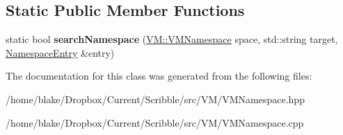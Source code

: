 \subsection*{Static Public Member Functions}
\begin{DoxyCompactItemize}
\item 
\hypertarget{class_v_m_1_1_namespace_entry_ad60d6ff4c19fdcd7ed3bf36ff6874bcf}{static bool {\bfseries search\-Namespace} (\hyperlink{class_hash_map}{V\-M\-::\-V\-M\-Namespace} space, std\-::string target, \hyperlink{class_v_m_1_1_namespace_entry}{Namespace\-Entry} \&entry)}\label{class_v_m_1_1_namespace_entry_ad60d6ff4c19fdcd7ed3bf36ff6874bcf}

\end{DoxyCompactItemize}


The documentation for this class was generated from the following files\-:\begin{DoxyCompactItemize}
\item 
/home/blake/\-Dropbox/\-Current/\-Scribble/src/\-V\-M/V\-M\-Namespace.\-hpp\item 
/home/blake/\-Dropbox/\-Current/\-Scribble/src/\-V\-M/V\-M\-Namespace.\-cpp\end{DoxyCompactItemize}
